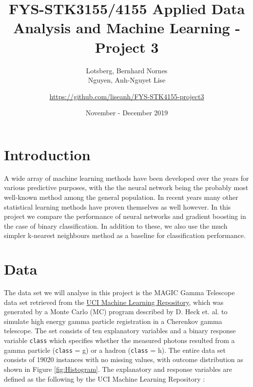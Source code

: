 \documentclass[a4paper, 11pt, twocolumn]{article}
\title{FYS-STK3155/4155 Applied Data Analysis and Machine Learning - Project 3 }
\author{Lotsberg, Bernhard Nornes \\ Nguyen, Anh-Nguyet Lise \and
\url{https://github.com/liseanh/FYS-STK4155-project3}}
\date{November - December 2019}
\begin{document}


\section{Introduction}
A wide array of machine learning methods have been developed over the years for 
various predictive purposes, with the the neural network being the probably most 
well-known method among the general population. In recent years many other 
statistical learning methods have proven themselves as well however. In this 
project we compare the performance of neural networks and gradient boosting in 
the case of binary classification. In addition to these, we also use the much 
simpler k-nearest neighbours method as a baseline for classification performance.



\section{Data}

The data set we will analyse in this project is the MAGIC Gamma Telescope data
set retrieved from the \href{https://archive.ics.uci.edu/ml/datasets/MAGIC+Gamma
+Telescope}{UCI Machine Learning Repository}, which was generated by a Monte
Carlo (MC) program described by D. Heck et. al. \cite{heck1998corsika} to
simulate high energy gamma particle registration in a Cherenkov gamma telescope.
The set consists of ten explanatory variables and a binary response variable
\texttt{class} which specifies whether the measured photons resulted from a gamma
particle (\texttt{class} = g) or a hadron (\texttt{class} = h). The entire data
set consists of 19020 instances with no missing values, with outcome distribution
as shown in Figure \ref{fig:Histogram}. The explanatory and response variables
are defined as the following by the UCI Machine Learning Repository
\cite{Dua:2019}:
\end{document}
